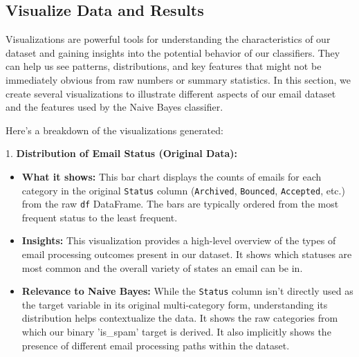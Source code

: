 \documentclass[12pt,a4paper]{article}
\begin{document}
\subsection{Visualize Data and Results}

Visualizations are powerful tools for understanding the characteristics of our dataset and gaining insights into the potential behavior of our classifiers. They can help us see patterns, distributions, and key features that might not be immediately obvious from raw numbers or summary statistics. In this section, we create several visualizations to illustrate different aspects of our email dataset and the features used by the Naive Bayes classifier.

Here's a breakdown of the visualizations generated:

1.  \textbf{Distribution of Email Status (Original Data):}
\begin{itemize}
    \item \textbf{What it shows:} This bar chart displays the counts of emails for each category in the original \texttt{Status} column (\texttt{Archived}, \texttt{Bounced}, \texttt{Accepted}, etc.) from the raw \texttt{df} DataFrame. The bars are typically ordered from the most frequent status to the least frequent.
    \item \textbf{Insights:} This visualization provides a high-level overview of the types of email processing outcomes present in our dataset. It shows which statuses are most common and the overall variety of states an email can be in.
    \item \textbf{Relevance to Naive Bayes:} While the \texttt{Status} column isn't directly used as the target variable in its original multi-category form, understanding its distribution helps contextualize the data. It shows the raw categories from which our binary 'is\_spam' target is derived. It also implicitly shows the presence of different email processing paths within the dataset.
\end{itemize}
\end{document}
